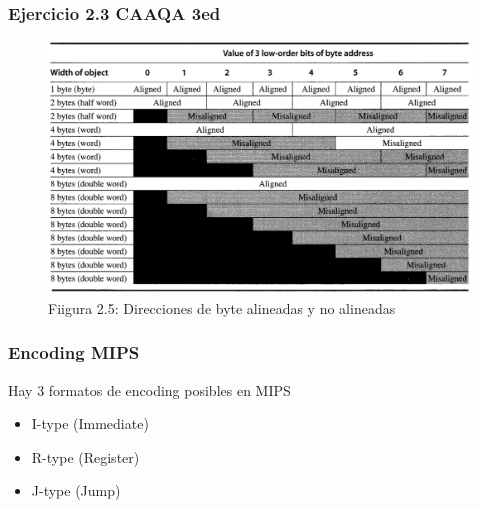 \documentclass{beamer}
\begin{document}
\begin{frame}
 \frametitle{Ejercicio 2.3 CAAQA 3ed}
 \begin{center}
 \begin{figure}
 \includegraphics[scale=.35,keepaspectratio=true]{align.png}
 \caption*{Fiigura 2.5: Direcciones de byte alineadas y no alineadas} %

 \end{figure}

\end{center}
 \end{frame}


\begin{frame}
 \frametitle{Encoding MIPS} 
 Hay 3 formatos de encoding posibles en MIPS
 \begin{itemize}
  \item I-type (Immediate)
  \item R-type (Register)
  \item J-type (Jump)
 \end{itemize}
\end{frame}
\end{document}

